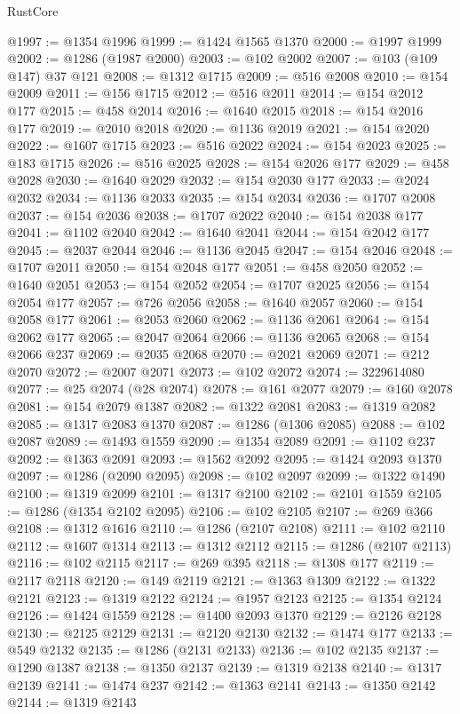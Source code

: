 \begin{lexlean}{RustCore}
\begin{coremodule}
@1997 := @1354 @1996
@1999 := @1424 @1565 @1370
@2000 := @1997 @1999
@2002 := @1286 (@1987 @2000)
@2003 := @102 @2002
@2007 := @103 (@109 @147) @37 @121
@2008 := @1312 @1715
@2009 := @516 @2008
@2010 := @154 @2009
@2011 := @156 @1715
@2012 := @516 @2011
@2014 := @154 @2012 @177
@2015 := @458 @2014
@2016 := @1640 @2015
@2018 := @154 @2016 @177
@2019 := @2010 @2018
@2020 := @1136 @2019
@2021 := @154 @2020
@2022 := @1607 @1715
@2023 := @516 @2022
@2024 := @154 @2023
@2025 := @183 @1715
@2026 := @516 @2025
@2028 := @154 @2026 @177
@2029 := @458 @2028
@2030 := @1640 @2029
@2032 := @154 @2030 @177
@2033 := @2024 @2032
@2034 := @1136 @2033
@2035 := @154 @2034
@2036 := @1707 @2008
@2037 := @154 @2036
@2038 := @1707 @2022
@2040 := @154 @2038 @177
@2041 := @1102 @2040
@2042 := @1640 @2041
@2044 := @154 @2042 @177
@2045 := @2037 @2044
@2046 := @1136 @2045
@2047 := @154 @2046
@2048 := @1707 @2011
@2050 := @154 @2048 @177
@2051 := @458 @2050
@2052 := @1640 @2051
@2053 := @154 @2052
@2054 := @1707 @2025
@2056 := @154 @2054 @177
@2057 := @726 @2056
@2058 := @1640 @2057
@2060 := @154 @2058 @177
@2061 := @2053 @2060
@2062 := @1136 @2061
@2064 := @154 @2062 @177
@2065 := @2047 @2064
@2066 := @1136 @2065
@2068 := @154 @2066 @237
@2069 := @2035 @2068
@2070 := @2021 @2069
@2071 := @212 @2070
@2072 := @2007 @2071
@2073 := @102 @2072
@2074 := 3229614080
@2077 := @25 @2074 (@28 @2074)
@2078 := @161 @2077
@2079 := @160 @2078
@2081 := @154 @2079 @1387
@2082 := @1322 @2081
@2083 := @1319 @2082
@2085 := @1317 @2083 @1370
@2087 := @1286 (@1306 @2085)
@2088 := @102 @2087
@2089 := @1493 @1559
@2090 := @1354 @2089
@2091 := @1102 @237
@2092 := @1363 @2091
@2093 := @1562 @2092
@2095 := @1424 @2093 @1370
@2097 := @1286 (@2090 @2095)
@2098 := @102 @2097
@2099 := @1322 @1490
@2100 := @1319 @2099
@2101 := @1317 @2100
@2102 := @2101 @1559
@2105 := @1286 (@1354 @2102 @2095)
@2106 := @102 @2105
@2107 := @269 @366
@2108 := @1312 @1616
@2110 := @1286 (@2107 @2108)
@2111 := @102 @2110
@2112 := @1607 @1314
@2113 := @1312 @2112
@2115 := @1286 (@2107 @2113)
@2116 := @102 @2115
@2117 := @269 @395
@2118 := @1308 @177
@2119 := @2117 @2118
@2120 := @149 @2119
@2121 := @1363 @1309
@2122 := @1322 @2121
@2123 := @1319 @2122
@2124 := @1957 @2123
@2125 := @1354 @2124
@2126 := @1424 @1559
@2128 := @1400 @2093 @1370
@2129 := @2126 @2128
@2130 := @2125 @2129
@2131 := @2120 @2130
@2132 := @1474 @177
@2133 := @549 @2132
@2135 := @1286 (@2131 @2133)
@2136 := @102 @2135
@2137 := @1290 @1387
@2138 := @1350 @2137
@2139 := @1319 @2138
@2140 := @1317 @2139
@2141 := @1474 @237
@2142 := @1363 @2141
@2143 := @1350 @2142
@2144 := @1319 @2143

\end{coremodule}
\end{lexlean}

